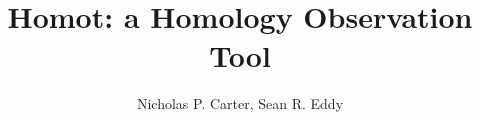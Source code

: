 \title{Homot: a Homology Observation Tool}
\subtitle{}
\author{Nicholas P. Carter, Sean R. Eddy}
\subauthor{}

